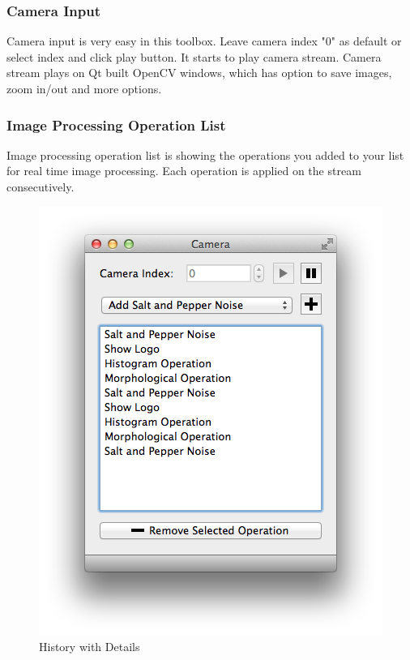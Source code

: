 \documentclass{article}
\begin{document}
\subsubsection{Camera Input}

	Camera input is very easy in this toolbox. Leave camera index "0" as default or select index and click play button. It starts to play camera stream. Camera stream plays on Qt built OpenCV windows, which has option to save images, zoom in/out and more options.

\subsubsection{Image Processing Operation List}
	Image processing operation list is showing the operations you added to your list for real time image processing. Each operation is applied on the stream consecutively. 
	
\begin{figure}[H]
\begin{center}
\includegraphics[scale=0.42]{cameraToolboxOperationList.png}
\caption{History with Details}
\end{center}
\end{figure}	
\end{document}
